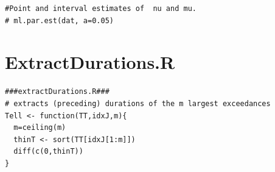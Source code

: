 \documentclass[honours,12pt,twoside, openright]{unswthesis}
\newcommand{\1}{\mathbf 1}
\numberwithin{equation}{section}
\theoremstyle{definition}
\theoremstyle{remark}
\begin{document}
\begin{appendices}
\begin{lstlisting}
#Point and interval estimates of  nu and mu. 
# ml.par.est(dat, a=0.05)
\end{lstlisting}
\section{ExtractDurations.R}
\begin{lstlisting}
###extractDurations.R###
# extracts (preceding) durations of the m largest exceedances
Tell <- function(TT,idxJ,m){
  m=ceiling(m)
  thinT <- sort(TT[idxJ[1:m]])
  diff(c(0,thinT))
}
\end{lstlisting}

\end{appendices}

\clearpage
{}


\end{document}
